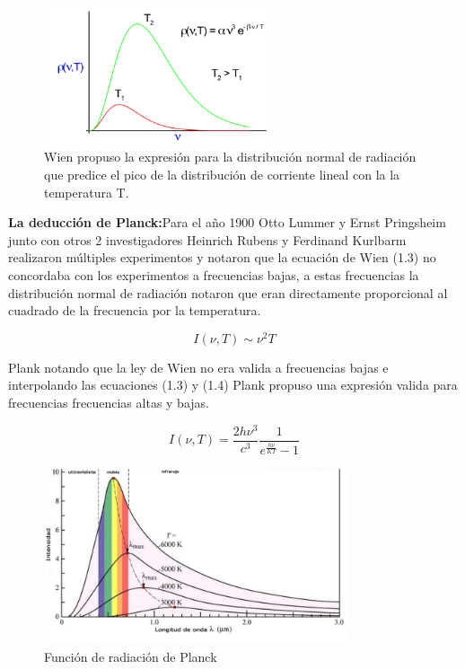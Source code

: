 \begin{figure}[htb!]
\centering
\includegraphics[width=0.6\textwidth]{images/5.png}
\caption[Descripción versión comprimida]{Wien propuso la expresión para la distribución normal de radiación que predice el pico de la distribución de corriente lineal con la la temperatura T.\cite{plank}}
 \label{fig1}
\end{figure}

\textbf{La deducción de Planck:}Para el año 1900 Otto Lummer y Ernst Pringsheim junto con otros 2 investigadores Heinrich Rubens y Ferdinand Kurlbarm realizaron múltiples experimentos y notaron que la ecuación de Wien (1.3) no concordaba con los experimentos a frecuencias bajas, a estas frecuencias la distribución normal de radiación notaron que eran directamente proporcional al cuadrado de la frecuencia por la temperatura.

\begin{equation}
    I(\nu,T) \sim \nu^{2} T
\end{equation}{}

Plank notando que la ley de Wien no era valida a frecuencias bajas e interpolando las ecuaciones (1.3) y (1.4) Plank propuso una expresión valida para frecuencias frecuencias altas y bajas.

\begin{equation}
    I(\nu,T)= \frac{2 h \nu^3}{c^3}\frac{1}{e^\frac{h\nu}{KT}-1}  
\end{equation}{}


\begin{figure}[htb!]
\centering
\includegraphics[width=0.8\textwidth]{images/6.png}
\caption[Descripción versión comprimida]{Función de radiación de Planck\cite{gra6}}
 \label{fig2}
\end{figure}




